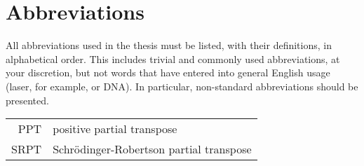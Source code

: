 \chapter*{Abbreviations} 

All abbreviations used in the thesis must be listed, with their definitions, in alphabetical order.  This includes trivial and commonly used abbreviations, at your discretion, but not words that have entered into general English usage (laser, for example, or DNA).  In particular, non-standard abbreviations should be presented.

\begin{longtable}{rl}
PPT & positive partial transpose\\
SRPT & Schr\"odinger-Robertson partial transpose
\end{longtable}